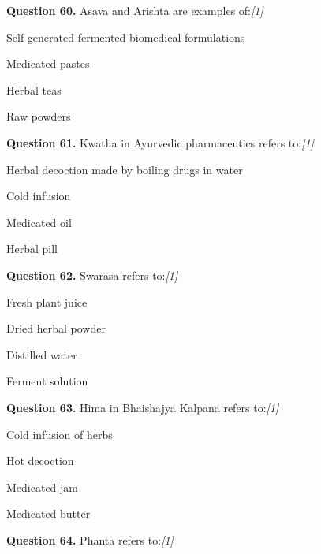 \documentclass[11pt,a4paper]{article}
\newcommand{\pts}[1]{\hfill   \textit{[#1]}}
\begin{document}
\noindent   \textbf{Question 60.} Asava and Arishta are examples of:\pts{1}

\begin{parts}
  \item Self-generated fermented biomedical formulations
  \item Medicated pastes
  \item Herbal teas
  \item Raw powders
\end{parts}

\medskip




\noindent   \textbf{Question 61.} Kwatha in Ayurvedic pharmaceutics refers to:\pts{1}

\begin{parts}
  \item Herbal decoction made by boiling drugs in water
  \item Cold infusion
  \item Medicated oil
  \item Herbal pill
\end{parts}

\medskip




\noindent   \textbf{Question 62.} Swarasa refers to:\pts{1}

\begin{parts}
  \item Fresh plant juice
  \item Dried herbal powder
  \item Distilled water
  \item Ferment solution
\end{parts}

\medskip




\noindent   \textbf{Question 63.} Hima in Bhaishajya Kalpana refers to:\pts{1}

\begin{parts}
  \item Cold infusion of herbs
  \item Hot decoction
  \item Medicated jam
  \item Medicated butter
\end{parts}

\medskip




\noindent   \textbf{Question 64.} Phanta refers to:\pts{1}
\end{document}
